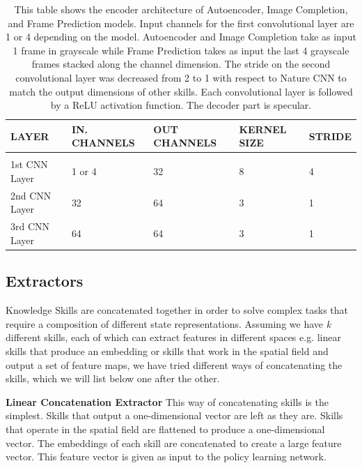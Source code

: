 \begin{table}[htbp]
    \begin{center}
        \begin{tabular}{lllll}
            \multicolumn{1}{l}{LAYER}  &\multicolumn{1}{l}{\bf IN. CHANNELS}  &\multicolumn{1}{l}{\bf OUT CHANNELS}  &\multicolumn{1}{l}{\bf KERNEL SIZE}  &\multicolumn{1}{l}{\bf STRIDE}
            \\ \hline \\
            1st CNN Layer   &  1 or 4  & 32 & 8 & 4 \\
            2nd CNN Layer   &  32  & 64 & 3 & 1 \\
            3rd CNN Layer   &  64  & 64 & 3 & 1 \\

        \end{tabular}
    \end{center}
    \caption{This table shows the encoder architecture of Autoencoder, Image Completion, and Frame Prediction models. Input channels for the first convolutional layer are 1 or 4 depending on the model. Autoencoder and Image Completion take as input 1 frame in grayscale while Frame Prediction takes as input the last 4 grayscale frames stacked along the channel dimension. The stride on the second convolutional layer was decreased from 2 to 1 with respect to Nature CNN to match the output dimensions of other skills. Each convolutional layer is followed by a ReLU activation function. The decoder part is specular.}
    \label{tab:nature_cnn}
\end{table}

\subsection{Extractors}
\label{sec:extractors}
Knowledge Skills are concatenated together in order to solve complex tasks that require a composition of different state representations.
Assuming we have \textit{k} different skills, each of which can extract features in different spaces e.g. linear skills that produce an embedding or skills that work in the spatial field and output a set of feature maps, we have tried different ways of concatenating the skills, which we will list below one after the other.

\textbf{Linear Concatenation Extractor}
This way of concatenating skills is the simplest. Skills that output a one-dimensional vector are left as they are. Skills that operate in the spatial field are flattened to produce a one-dimensional vector.
The embeddings of each skill are concatenated to create a large feature vector. This feature vector is given as input to the policy learning network.

